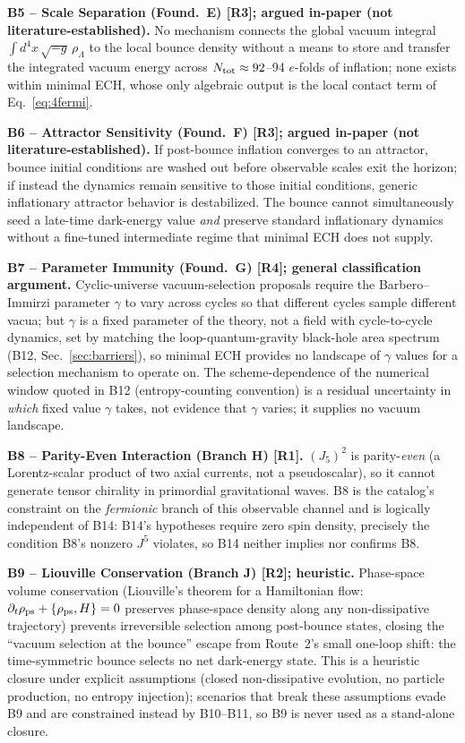 \documentclass[aps,prd,twocolumn,superscriptaddress,preprintnumbers,nofootinbib,longbibliography,floatfix]{revtex4-2}
\begin{document}
\medskip\noindent\textbf{B5 -- Scale Separation (Found.\ E) [R3]; argued
in-paper (not literature-established).} No mechanism connects the global vacuum integral
$\int d^4x\,\sqrt{-g}\,\rho_\Lambda$ to the local bounce density without
a means to store and transfer the integrated vacuum energy across
$N_{\rm tot}\approx92$--94 $e$-folds of inflation; none exists within
minimal ECH, whose only algebraic output is the local contact term of
Eq.~\eqref{eq:4fermi}.

\medskip\noindent\textbf{B6 -- Attractor Sensitivity (Found.\ F) [R3];
argued in-paper (not literature-established).} If post-bounce inflation converges to an
attractor, bounce initial conditions are washed out before observable
scales exit the horizon; if instead the dynamics remain sensitive to
those initial conditions, generic inflationary attractor behavior is
destabilized. The bounce cannot simultaneously seed a late-time
dark-energy value \emph{and} preserve standard inflationary dynamics
without a fine-tuned intermediate regime that minimal ECH does not
supply.

\medskip\noindent\textbf{B7 -- Parameter Immunity (Found.\ G) [R4];
general classification argument.} Cyclic-universe vacuum-selection
proposals require the Barbero--Immirzi parameter $\gamma$ to vary across
cycles so that different cycles sample different vacua; but $\gamma$ is a
fixed parameter of the theory, not a field with cycle-to-cycle dynamics,
set by matching the loop-quantum-gravity black-hole area
spectrum~\cite{Ashtekar2011,GhoshMitra2005} (B12,
Sec.~\ref{sec:barriers}), so minimal ECH provides no landscape of
$\gamma$ values for a selection mechanism to operate on. The
scheme-dependence of the numerical window quoted in B12 (entropy-counting
convention) is a residual uncertainty in \emph{which} fixed value $\gamma$
takes, not evidence that $\gamma$ varies; it supplies no vacuum landscape.

\medskip\noindent\textbf{B8 -- Parity-Even Interaction (Branch H) [R1].}
$(J_5)^2$ is parity-\emph{even} (a Lorentz-scalar product of two axial
currents, not a pseudoscalar), so it cannot generate tensor chirality in
primordial gravitational waves. B8 is the catalog's constraint on the
\emph{fermionic} branch of this observable channel and is logically
independent of B14: B14's hypotheses require zero spin density,
precisely the condition B8's nonzero $J^5$ violates, so B14 neither
implies nor confirms B8.

\medskip\noindent\textbf{B9 -- Liouville Conservation (Branch J) [R2];
heuristic.} Phase-space volume conservation (Liouville's theorem for a
Hamiltonian flow: $\partial_t\rho_{\rm ps}+\{\rho_{\rm ps},H\}=0$
preserves phase-space density along any non-dissipative trajectory)
prevents irreversible selection among post-bounce states, closing the
``vacuum selection at the bounce'' escape from Route~2's small one-loop
shift: the time-symmetric bounce selects no net dark-energy state. This is a
heuristic closure under explicit assumptions (closed non-dissipative
evolution, no particle production, no entropy injection); scenarios that
break these assumptions evade B9 and are constrained instead by
B10--B11, so B9 is never used as a stand-alone closure.
\end{document}
